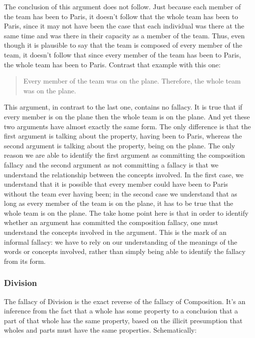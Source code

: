 The conclusion of this argument does not follow. Just because each member of
the team has been to Paris, it doesn't follow that the whole team has been to
Paris, since it may not have been the case that each individual was there at the
same time and was there in their capacity as a member of the team. Thus, even
though it is plausible to say that the team is composed of every member of the
team, it doesn't follow that since every member of the team has been to Paris,
the whole team has been to Paris. Contrast that example with this one:

\begin{quote}       Every member of the team was on the plane. Therefore, the whole team
       was on the plane.\end{quote}

This argument, in contrast to the last one, contains no fallacy. It is true that if
every member is on the plane then the whole team is on the plane. And yet
these two arguments have almost exactly the same form. The only difference is
that the first argument is talking about the property, having been to Paris,
whereas the second argument is talking about the property, being on the plane.
The only reason we are able to identify the first argument as committing the
composition fallacy and the second argument as not committing a fallacy is that
we understand the relationship between the concepts involved. In the first case,
we understand that it is possible that every member could have been to Paris
without the team ever having been; in the second case we understand that as
long as every member of the team is on the plane, it has to be true that the
whole team is on the plane. The take home point here is that in order to identify
whether an argument has committed the composition fallacy, one must
understand the concepts involved in the argument. This is the mark of an
informal fallacy: we have to rely on our understanding of the meanings of the
words or concepts involved, rather than simply being able to identify the fallacy
from its form.

\subsubsection{Division}
The fallacy of Division is the exact reverse of the fallacy of Composition. It's an inference from
the fact that a whole has some property to a conclusion that a part of that whole has the same
property, based on the illicit presumption that wholes and parts must have the same properties.
Schematically:

